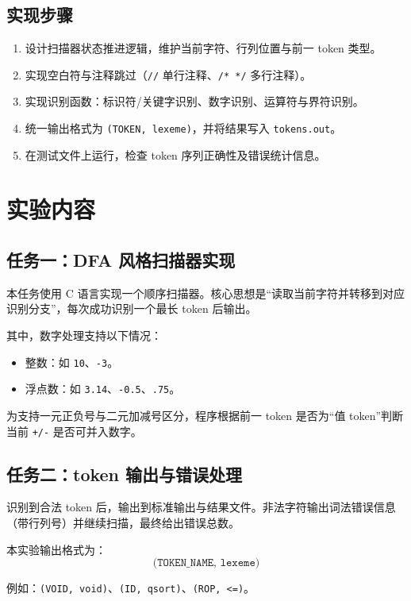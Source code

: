 \documentclass[12pt,a4paper]{ctexart}
\begin{document}
\subsection{实现步骤}
\begin{enumerate}
	\item 设计扫描器状态推进逻辑，维护当前字符、行列位置与前一 token 类型。
	\item 实现空白符与注释跳过（\texttt{//} 单行注释、\texttt{/* */} 多行注释）。
	\item 实现识别函数：标识符/关键字识别、数字识别、运算符与界符识别。
	\item 统一输出格式为 \texttt{(TOKEN, lexeme)}，并将结果写入 \texttt{tokens.out}。
	\item 在测试文件上运行，检查 token 序列正确性及错误统计信息。
\end{enumerate}

\section{实验内容}
\subsection{任务一：DFA 风格扫描器实现}
本任务使用 C 语言实现一个顺序扫描器。核心思想是“读取当前字符并转移到对应识别分支”，每次成功识别一个最长 token 后输出。

其中，数字处理支持以下情况：
\begin{itemize}
	\item 整数：如 \texttt{10}、\texttt{-3}。
	\item 浮点数：如 \texttt{3.14}、\texttt{-0.5}、\texttt{.75}。
\end{itemize}

为支持一元正负号与二元加减号区分，程序根据前一 token 是否为“值 token”判断当前 \texttt{+/-} 是否可并入数字。

\subsection{任务二：token 输出与错误处理}
识别到合法 token 后，输出到标准输出与结果文件。非法字符输出词法错误信息（带行列号）并继续扫描，最终给出错误总数。

本实验输出格式为：
\begin{equation}
\texttt{(TOKEN\_NAME, lexeme)}
\end{equation}

例如：\texttt{(VOID, void)}、\texttt{(ID, qsort)}、\texttt{(ROP, <=)}。
\end{document}
